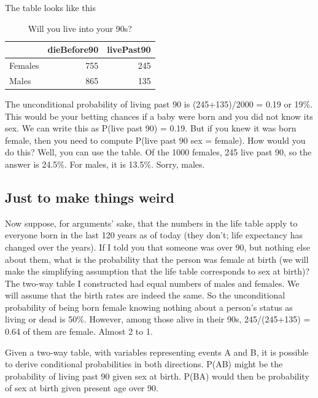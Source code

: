 \documentclass[
  openany]{book}
\begin{document}
The table looks like this

\begin{table}[!h]

\caption{\label{tab:unnamed-chunk-19}Will you live into your 90s?}
\centering
\begin{tabular}[t]{lrr}
\toprule
  & dieBefore90 & livePast90\\
\midrule
Females & 755 & 245\\
Males & 865 & 135\\
\bottomrule
\end{tabular}
\end{table}

The unconditional probability of living past 90 is (245+135)/2000 = 0.19 or 19\%. This would be your betting chances if a baby were born and you did not know its sex. We can write this as P(live past 90) = 0.19. But if you knew it was born female, then you need to compute P(live past 90 \textbar{} sex = female). How would you do this? Well, you can use the table. Of the 1000 females, 245 live past 90, so the answer is 24.5\%. For males, it is 13.5\%. Sorry, males.

\hypertarget{just-to-make-things-weird}{%
\subsection*{Just to make things weird}\label{just-to-make-things-weird}}

Now suppose, for arguments' sake, that the numbers in the life table apply to everyone born in the last 120 years as of today (they don't; life expectancy has changed over the years). If I told you that someone was over 90, but nothing else about them, what is the probability that the person was female at birth (we will make the simplifying assumption that the life table corresponds to sex at birth)? The two-way table I constructed had equal numbers of males and females. We will assume that the birth rates are indeed the same. So the unconditional probability of being born female knowing nothing about a person's status as living or dead is 50\%. However, among those alive in their 90s, 245/(245+135) = 0.64 of them are female. Almost 2 to 1.

Given a two-way table, with variables representing events A and B, it is possible to derive conditional probabilities in both directions. P(A\textbar B) might be the probability of living past 90 given sex at birth. P(B\textbar A) would then be probability of sex at birth given present age over 90.
\end{document}
